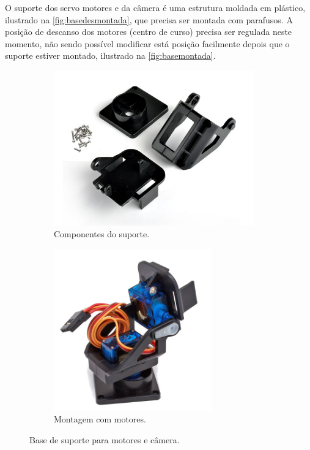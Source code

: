 O suporte dos servo motores e da câmera é uma estrutura moldada em plástico, ilustrado na \autoref{fig:basedesmontada}, que precisa ser montada com parafusos. A posição de descanso dos motores (centro de curso) precisa ser regulada neste momento, não sendo possível modificar está posição facilmente depois que o suporte estiver montado, ilustrado na \autoref{fig:basemontada}.\par

\begin{figure}[H]
	\centering
	\begin{subfigure}{.5\textwidth}
		\includegraphics[width=0.95\textwidth]{figuras/base2.jpg}
		\caption{Componentes do suporte.}
		\label{fig:basedesmontada}
	\end{subfigure}%
	\begin{subfigure}{.5\textwidth}
		\includegraphics[width=0.75\textwidth]{figuras/base3.jpg}
		\caption{Montagem com motores.}
		\label{fig:basemontada}
	\end{subfigure}
	\caption{Base de suporte para motores e câmera.}
\end{figure}

